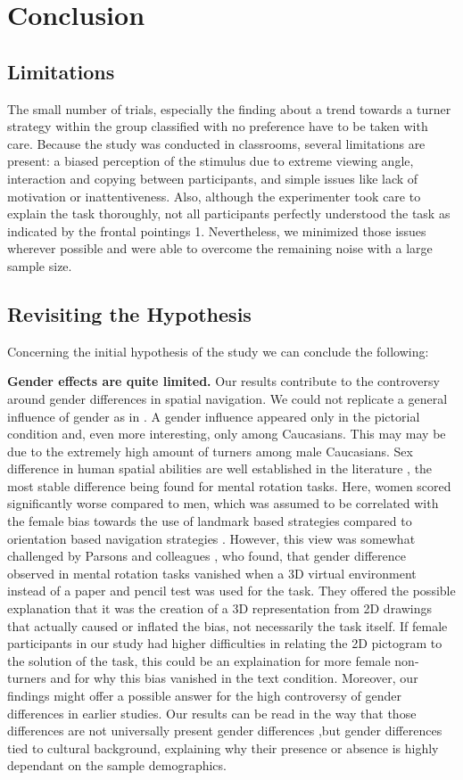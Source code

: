 \documentclass{frontiersSCNS} %
\begin{document}
\section{Conclusion}
\subsection{Limitations}
The small number of trials, especially the finding about a trend towards a turner strategy within the group classified with no preference have to be taken with care. Because the study was conducted in classrooms, several limitations are present: a biased perception of the stimulus due to extreme viewing angle, interaction and copying between participants, and simple issues like lack of motivation or inattentiveness. Also, although the experimenter took care to explain the task thoroughly, not all participants perfectly understood the task as indicated by the frontal pointings 1. Nevertheless, we minimized those issues wherever possible and were able to overcome the remaining noise with a large sample size.

\subsection{Revisiting the Hypothesis}
Concerning the initial hypothesis of the study we can conclude the following:

\textbf{Gender effects are quite limited.}
Our results contribute to the controversy around gender differences in spatial navigation. We could not replicate a general influence of gender as in \citep{Goeke2013}. A gender influence appeared only in the pictorial condition and, even more interesting, only among Caucasians. This may may be due to the extremely high amount of turners among male Caucasians.
Sex difference in human spatial abilities are well established in the literature \citep{Linn1985,Voyer1995}, the most stable difference being found for mental rotation tasks. Here, women scored significantly worse compared to men, which was assumed to be correlated with the female bias towards the use of landmark based strategies compared to orientation based navigation strategies \citep{Moffat1998,Dabbs1998,Astur1998}. However, this view was somewhat challenged by Parsons and colleagues \citep{Parsons2004}, who found, that gender difference observed in mental rotation tasks vanished when a 3D virtual environment instead of a paper and pencil test was used for the task. They offered the possible explanation that it was the creation of a 3D representation from 2D drawings that actually caused or inflated the bias, not necessarily the task itself. If female participants in our study had higher difficulties in relating the 2D pictogram to the solution of the task, this could be an explaination for more female non-turners and for why this bias vanished in the text condition. Moreover, our findings might offer a possible answer for the high controversy of gender differences in earlier studies. Our results can be read in the way that those differences are not universally present gender differences ,but gender differences tied to cultural background, explaining why their presence or absence is highly dependant on the sample demographics.
\end{document}
